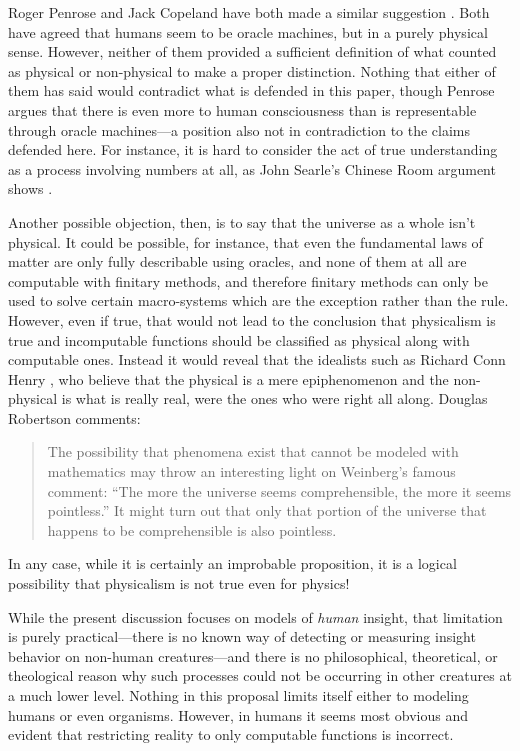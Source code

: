 Roger Penrose and Jack Copeland have both made a similar suggestion \citep{copeland1998, hodges2000}.  Both have agreed that humans seem to be oracle machines, but in a purely physical sense.  However, neither of them provided a sufficient definition of what counted as physical or non-physical to make a proper distinction.  Nothing that either of them has said would contradict what is defended in this paper, though Penrose argues that there is even more to human consciousness than is representable through oracle machines---a position also not in contradiction to the claims defended here.   For instance, it is hard to consider the act of true understanding as a process involving numbers at all, as John Searle's Chinese Room argument shows \citep{searle1980}.

Another possible objection, then, is to say that the universe as a whole isn't physical.  It could be possible, for instance, that even the fundamental laws of matter are only fully describable using oracles, and none of them at all are computable with finitary methods, and therefore finitary methods can only be used to solve certain macro-systems which are the exception rather than the rule.  However, even if true, that would not lead to the conclusion that physicalism is true and incomputable functions should be classified as physical along with computable ones.  Instead it would reveal that the idealists such as Richard Conn Henry \citeyearpar{henry2005}, who believe that the physical is a mere epiphenomenon and the non-physical is what is really real, were the ones who were right all along.  Douglas Robertson \citeyearpar{robertson1999} comments:

\begin{quote}
The possibility that phenomena exist that cannot be modeled with mathematics may throw an interesting light on Weinberg's famous comment: ``The more the universe seems comprehensible, the more it seems pointless.'' It might turn out that only that portion of the universe that happens to be comprehensible is also pointless.
\end{quote}

In any case, while it is certainly an improbable proposition, it is a logical possibility that physicalism is not true even for physics!  

While the present discussion focuses on models of \textit{human} insight, that limitation is purely practical---there is no known way of detecting or measuring insight behavior on non-human creatures---and there is no philosophical, theoretical, or theological reason why such processes could not be occurring in other creatures at a much lower level.  Nothing in this proposal limits itself either to modeling humans or even organisms.  However, in humans it seems most obvious and evident that restricting reality to only computable functions is incorrect.

